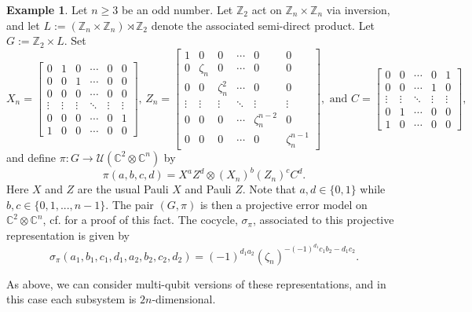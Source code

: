 \documentclass[11pt]{article}
\theoremstyle{definition}
\newtheorem{example}{Example}
\newcommand{\bbC}{\mathbb{C}}
\newcommand{\bbZ}{\mathbb{Z}}
\newcommand{\calU}{\mathcal{U}}
\begin{document}
\begin{example}\label{zlexample}
    Let $n \geq 3$ be an odd number. Let $\bbZ_2$ act on $\bbZ_n \times \bbZ_n$ via inversion, and let $L := (\bbZ_n \times \bbZ_n) \rtimes \bbZ_2$ denote the associated semi-direct product. Let $G := \bbZ_2 \times L$. Set
    \begin{equation*}
        X_n =
        \begin{bmatrix}
            0 & 1 & 0 & \cdots & 0 & 0 \\
            0 & 0 & 1 & \cdots & 0 & 0 \\
            0 & 0 & 0 & \cdots & 0 & 0 \\
            \vdots & \vdots & \vdots & \ddots & \vdots & \vdots \\
            0 & 0 & 0 & \cdots & 0 & 1 \\
            1 & 0 & 0 & \cdots & 0 & 0
        \end{bmatrix}, \,
        Z_n =
        \begin{bmatrix}
            1 & 0 & 0 & \cdots & 0 & 0 \\
            0 & \zeta_n & 0 & \cdots & 0 & 0 \\
            0 & 0 & \zeta_n^2 & \cdots & 0 & 0 \\
            \vdots & \vdots & \vdots & \ddots & \vdots & \vdots \\
            0 & 0 & 0 & \cdots & \zeta_n^{n-2} & 0 \\
            0 & 0 & 0 & \cdots & 0 & \zeta_n^{n-1}
        \end{bmatrix},
        \text{ and }
        C =
        \begin{bmatrix}
            0 & 0 & \cdots & 0 & 1 \\
            0 & 0 & \cdots & 1 & 0 \\
            \vdots & \vdots & \ddots & \vdots & \vdots \\
            0 & 1 & \cdots & 0 & 0 \\
            1 & 0 & \cdots & 0 & 0
        \end{bmatrix},
    \end{equation*}
     and define $\pi \colon G \to \calU(\bbC^2 \otimes \bbC^n)$ by
    \begin{equation}\label{zlexampleeqn}
        \pi(a,b,c,d) = X^a Z^d \otimes (X_n)^b (Z_n)^c C^d.
    \end{equation}
    Here $X$ and $Z$ are the usual Pauli $X$ and Pauli $Z$. Note that $a,d \in \{0,1\}$ while $b,c \in \{0,1,...,n-1\}$. The pair $(G,\pi)$ is then a projective error model on $\bbC^2 \otimes \bbC^n$, cf. \cite[Proposition 8.2]{Eidesen2025} for a proof of this fact. The cocycle, $\sigma_\pi$, associated to this projective representation is given by
    \begin{equation*}
        \sigma_\pi(a_1,b_1,c_1,d_1,a_2,b_2,c_2,d_2) = (-1)^{d_1a_2}(\zeta_n)^{-(-1)^{d_1}c_1b_2 - d_1c_2}.
    \end{equation*}

As above, we can consider multi-qubit versions of these representations, and in this case each subsystem is $2n$-dimensional. 
\end{example}
\end{document}
